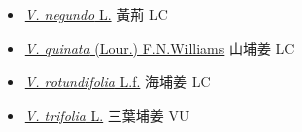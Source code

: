 \begin{itemize}
  \begin{itemize}
        \item[] \href{http://www.theplantlist.org/tpl1.1/search?q=Vitex+negundo}{\textit{V. negundo} L.}   黃荊 LC
        \item[] \href{http://www.theplantlist.org/tpl1.1/search?q=Vitex+quinata}{\textit{V. quinata} (Lour.) F.N.Williams}   山埔姜 LC
        \item[] \href{http://www.theplantlist.org/tpl1.1/search?q=Vitex+rotundifolia}{\textit{V. rotundifolia} L.f.}   海埔姜 LC
        \item[] \href{http://www.theplantlist.org/tpl1.1/search?q=Vitex+trifolia}{\textit{V. trifolia} L.}   三葉埔姜 VU
  \end{itemize}
  \end{itemize}
